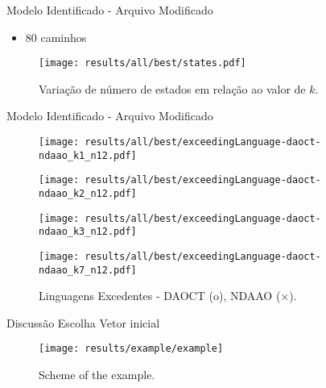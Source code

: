 \begin{frame}{Modelo Identificado - Arquivo Modificado}
\begin{itemize}
\item 80 caminhos 
\end{itemize}
\begin{figure}[H]
  \centering
  \texttt{[image: results/all/best/states.pdf]}
  \caption{Variação de número de estados em relação ao valor de $k$.}
    \label{fig:statesIdentOriginal}
\end{figure}
\end{frame}

\begin{frame}{Modelo Identificado - Arquivo Modificado}
   \begin{figure}[ht]
       \begin{minipage}[b]{0.35\linewidth}
         \centering
    \texttt{[image: results/all/best/exceedingLanguage-daoct-ndaao\_k1\_n12.pdf]}
\end{minipage}
       \begin{minipage}[b]{0.35\linewidth}
         \centering
    \texttt{[image: results/all/best/exceedingLanguage-daoct-ndaao\_k2\_n12.pdf]}
       \end{minipage}
       \hspace{0.5cm}
       \begin{minipage}[b]{0.35\linewidth}
           \centering
    \texttt{[image: results/all/best/exceedingLanguage-daoct-ndaao\_k3\_n12.pdf]}
       \end{minipage}
       \begin{minipage}[b]{0.35\linewidth}
           \centering
    \texttt{[image: results/all/best/exceedingLanguage-daoct-ndaao\_k7\_n12.pdf]}
       \end{minipage}
  \caption{Linguagens Excedentes - DAOCT (o), NDAAO ($\times$).}
   \end{figure}
\end{frame}


\begin{frame}{Discussão Escolha Vetor inicial}
\begin{figure}[H]
  \centering
  \texttt{[image: results/example/example]}
  \caption{Scheme of the example.}
    \label{fig:schemeExConveyor}
\end{figure}
\end{frame}


